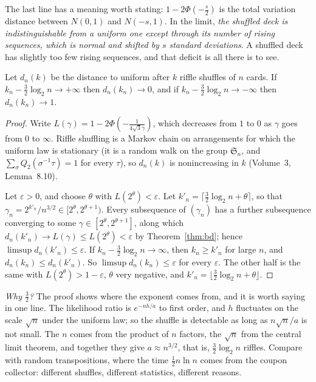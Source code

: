 The last line has a meaning worth stating: $1-2\Phi(-\frac s2)$ is the total variation distance between $N(0,1)$ and $N(-s,1)$. In the limit, \emph{the shuffled
deck is indistinguishable from a uniform one except through its number of rising sequences, which is normal and shifted by $s$ standard
deviations}. A shuffled deck has slightly too few rising sequences, and that deficit is all there is to see.

\begin{corollary}\label{cor:riffle}
Let $d_n(k)$ be the distance to uniform after $k$ riffle shuffles of $n$ cards. If $k_n-\frac32\log_2n\to+\infty$ then $d_n(k_n)\to0$, and if $k_n-\frac32\log_2n\to-\infty$ then $d_n(k_n)\to1$.
\end{corollary}

\begin{proof}
Write $L(\gamma)=1-2\Phi(-\frac1{4\sqrt3\gamma})$, which decreases from $1$ to $0$ as $\gamma$ goes from $0$ to $\infty$. Riffle shuffling is a Markov chain on arrangements for
which the uniform law is stationary (it is a random walk on the group $\mathfrak S_n$, and $\sum_\sigma Q_2(\sigma^{-1}\tau)=1$ for every $\tau$), so $d_n(k)$ is
nonincreasing in $k$ (Volume~3, Lemma~8.10).

Let $\varepsilon>0$, and choose $\theta$ with $L(2^\theta)<\varepsilon$. Let $k'_n=\lceil\frac32\log_2n+\theta\rceil$, so that $\gamma_n=2^{k'_n}/n^{3/2}\in[2^\theta,2^{\theta+1})$. Every subsequence of $(\gamma_n)$ has a further
subsequence converging to some $\gamma\in[2^\theta,2^{\theta+1}]$, along which $d_n(k'_n)\to L(\gamma)\le L(2^\theta)<\varepsilon$ by Theorem~\ref{thm:bd}; hence $\limsup d_n(k'_n)\le\varepsilon$. If $k_n-\frac32\log_2n\to\infty$,
then $k_n\ge k'_n$ for large $n$, and $d_n(k_n)\le d_n(k'_n)$. So $\limsup d_n(k_n)\le\varepsilon$ for every $\varepsilon$. The other half is the same with $L(2^\theta)>1-\varepsilon$, $\theta$ very negative, and $k'_n=\lfloor\frac32\log_2n+\theta\rfloor$.
\end{proof}

\emph{Why $\frac32$?} The proof shows where the exponent comes from, and it is worth saying in one line. The likelihood ratio is $e^{-nh/a}$ to first order, and $h$ fluctuates
on the scale $\sqrt n$ under the uniform law; so the shuffle is detectable as long as $n\sqrt n/a$ is not small. The $n$ comes from the product of $n$ factors, the $\sqrt n$ from
the central limit theorem, and together they give $a\approx n^{3/2}$, that is, $\frac32\log_2n$ riffles. Compare with random transpositions, where the time
$\frac12n\ln n$ comes from the coupon collector: different shuffles, different statistics, different reasons.

